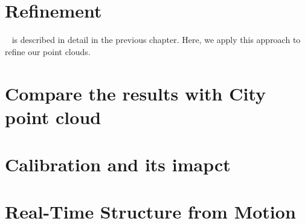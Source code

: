 \documentclass[11pt]{article}
\begin{document}
    \section{Refinement}
    ~\cite{lindenberger2021pixsfm} is described in detail in the previous chapter. Here, we apply this approach to
    refine our point clouds.

    \section{Compare the results with City point cloud}
    
    \section{Calibration and its imapct}

    \section{Real-Time Structure from Motion}
\end{document}
